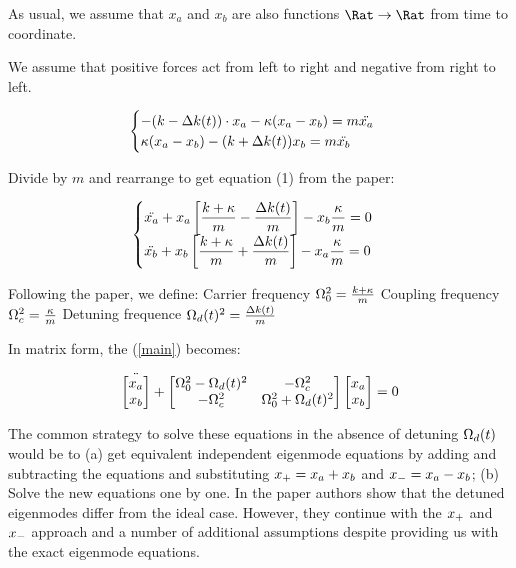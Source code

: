 As usual, we assume that $x_a$ and $x_b$ are also functions $\Rat \to \Rat$ from time to coordinate.

We assume that positive forces act from left to right and negative from right to left.

\[
\begin{cases}
  \displaystyle - (k - \Delta k(t)) \cdot x_a - \kappa (x_a - x_b) = m \ddot{x_a} \\
  \displaystyle \kappa(x_a - x_b) - (k + \Delta k(t)) x_b = m \ddot{x_b}
\end{cases}
\]

Divide by $m$ and rearrange to get equation (1) from the paper:

\begin{equation}
  \begin{cases}
    \displaystyle \ddot{x_a} + x_a\left[\frac{k + \kappa}{m} - \frac{\Delta k(t)}{m}\right] - x_b\frac{\kappa}{m} = 0 \\
    \displaystyle \ddot{x_b} + x_b\left[\frac{k + \kappa}{m} + \frac{\Delta k(t)}{m}\right] - x_a\frac{\kappa}{m} = 0
  \end{cases}
\label{main}
\end{equation}


Following the paper, we define:
\ls Carrier frequency $\Omega_0^2 = \frac{k+\kappa}{m}$
\li Coupling frequency $\Omega_c^2 = \frac{\kappa}{m}$
\li Detuning frequence $\Omega_d(t)^2 = \frac{\Delta k(t)}{m}$
\le


In matrix form, the (\ref{main}) becomes:

\[
\ddot{\begin{bmatrix}
  x_a \\
  x_b
\end{bmatrix}}
+
\begin{bmatrix}
  \Omega_0^2 - \Omega_d(t)^2 & -\Omega_c^2 \\
  -\Omega_c^2 & \Omega_0^2 + \Omega_d(t)^2
\end{bmatrix}
\begin{bmatrix}
  x_a \\
  x_b
\end{bmatrix}
=
0
\]


\begin{GREY}
The common strategy to solve these equations in the absence of detuning $\Omega_d(t)$ would be to (a) get
equivalent independent eigenmode equations by adding and subtracting the equations and substituting
$x_+ = x_a + x_b$ and $x_- = x_a - x_b$; (b) Solve the new equations one by one. In the paper
authors show that the detuned eigenmodes differ from the ideal case. However, they continue with the
$x_+$ and $x_-$ approach and a number of additional assumptions despite providing us with the exact
eigenmode equations.
\end{GREY}

